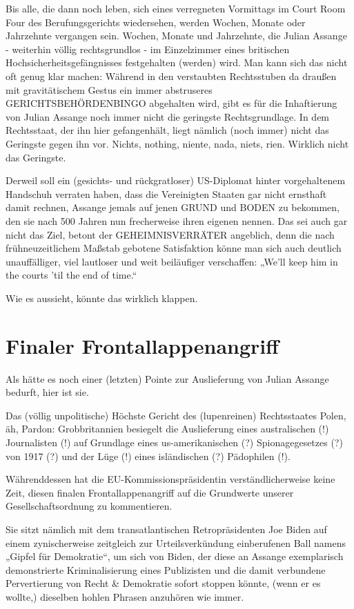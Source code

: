 \begin{multicols}{2}
Bis alle, die dann noch leben, sich eines verregneten
Vormittags im Court Room Four des Berufungsgerichts
wiedersehen, werden Wochen, Monate oder Jahrzehnte
vergangen sein. Wochen, Monate und Jahrzehnte, die
Julian Assange - weiterhin völlig rechtsgrundlos - im
Einzelzimmer eines britischen Hochsicherheitsgefängnisses festgehalten (werden) wird. Man kann sich das
nicht oft genug klar machen: Während in den verstaubten Rechtsstuben da draußen mit gravitätischem Gestus
ein immer abstruseres GERICHTSBEHÖRDENBINGO
abgehalten wird, gibt es für die Inhaftierung von Julian
Assange noch immer nicht die geringste Rechtsgrundlage. In dem Rechtsstaat, der ihn hier gefangenhält, liegt
nämlich (noch immer) nicht das Geringste gegen ihn
vor. Nichts, nothing, niente, nada, niets, rien. Wirklich
nicht das Geringste.

Derweil soll ein (gesichts- und rückgratloser) US-Diplomat hinter vorgehaltenem Handschuh verraten haben,
dass die Vereinigten Staaten gar nicht ernsthaft damit
rechnen, Assange jemals auf jenen GRUND und BODEN
zu bekommen, den sie nach 500 Jahren nun frecherweise ihren eigenen nennen. Das sei auch gar nicht das Ziel,
betont der GEHEIMNISVERRÄTER angeblich, denn die
nach frühneuzeitlichem Maßstab gebotene Satisfaktion
könne man sich auch deutlich unauffälliger, viel lautloser und weit beiläufiger verschaffen: „We’ll keep him in
the courts ’til the end of time.“

Wie es aussieht, könnte das wirklich klappen.


\section{Finaler Frontallappenangriff} %
Als hätte es noch einer (letzten) Pointe zur Auslieferung
von Julian Assange bedurft, hier ist sie.

Das (völlig unpolitische) Höchste Gericht des (lupenreinen) Rechtsstaates Polen, äh, Pardon: Grobbritannien
besiegelt die Auslieferung eines australischen (!) Journalisten (!) auf Grundlage eines us-amerikanischen (?)
Spionagegesetzes (?) von 1917 (?) und der Lüge (!) eines
isländischen (?) Pädophilen (!).

Währenddessen hat die EU-Kommissionspräsidentin
verständlicherweise keine Zeit, diesen finalen Frontallappenangriff auf die Grundwerte unserer Gesellschaftsordnung zu kommentieren.

Sie sitzt nämlich mit dem transatlantischen Retropräsidenten Joe Biden auf einem zynischerweise zeitgleich
zur Urteilsverkündung einberufenen Ball namens „Gipfel für Demokratie“, um sich von Biden, der diese an
Assange exemplarisch demonstrierte Kriminalisierung
eines Publizisten und die damit verbundene Pervertierung von Recht \& Demokratie sofort stoppen könnte,
(wenn er es wollte,) dieselben hohlen Phrasen anzuhören wie immer.


\end{multicols}
